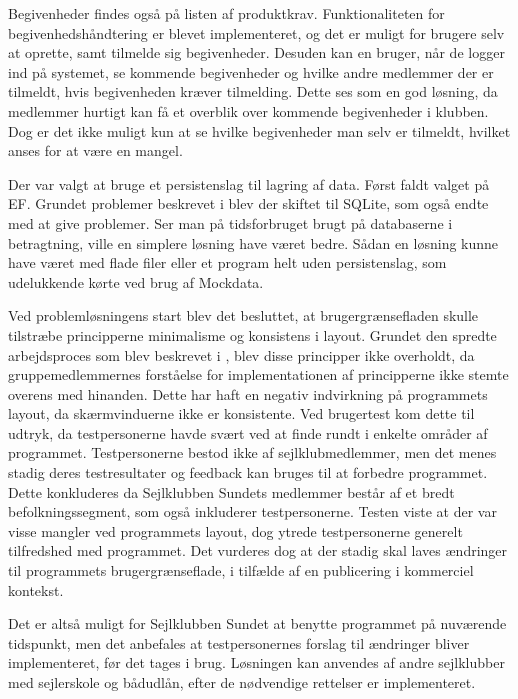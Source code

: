 Begivenheder findes også på listen af produktkrav.
Funktionaliteten for begivenhedshåndtering er blevet implementeret, og det er muligt for brugere selv at oprette, samt tilmelde sig begivenheder.
Desuden kan en bruger, når de logger ind på systemet, se kommende begivenheder og hvilke andre medlemmer der er tilmeldt, hvis begivenheden kræver tilmelding. 
Dette ses som en god løsning, da medlemmer hurtigt kan få et overblik over kommende begivenheder i klubben.
Dog er det ikke muligt kun at se hvilke begivenheder man selv er tilmeldt, hvilket anses for at være en mangel. 

Der var valgt at bruge et persistenslag til lagring af data. 
Først faldt valget på \acl{EF}. 
Grundet problemer beskrevet i  blev der skiftet til SQLite, som også endte med at give problemer. 
Ser man på tidsforbruget brugt på databaserne i betragtning, ville en simplere løsning have været bedre.
Sådan en løsning kunne have været med flade filer eller et program helt uden persistenslag, som udelukkende kørte ved brug af Mockdata.  

Ved problemløsningens start blev det besluttet, at brugergrænsefladen skulle tilstræbe principperne minimalisme og konsistens i layout.
Grundet den spredte arbejdsproces som blev beskrevet i , blev disse principper ikke overholdt, da gruppemedlemmernes forståelse for implementationen af principperne ikke stemte overens med hinanden.
Dette har haft en negativ indvirkning på programmets layout, da skærmvinduerne ikke er konsistente.
Ved brugertest kom dette til udtryk, da testpersonerne havde svært ved at finde rundt i enkelte områder af programmet. 
Testpersonerne bestod ikke af sejlklubmedlemmer, men det menes stadig deres testresultater og feedback kan bruges til at forbedre programmet.
Dette konkluderes da Sejlklubben Sundets medlemmer består af et bredt befolkningssegment, som også inkluderer testpersonerne.
Testen viste at der var visse mangler ved programmets layout, dog ytrede testpersonerne generelt tilfredshed med programmet.
Det vurderes dog at der stadig skal laves ændringer til programmets brugergrænseflade, i tilfælde af en publicering i kommerciel kontekst. 

Det er altså muligt for Sejlklubben Sundet at benytte programmet på nuværende tidspunkt, men det anbefales at testpersonernes forslag til ændringer bliver implementeret, før det tages i brug.
Løsningen kan anvendes af andre sejlklubber med sejlerskole og bådudlån, efter de nødvendige rettelser er implementeret. 

